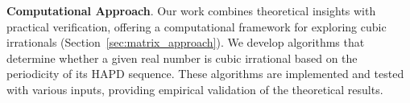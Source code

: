 \textbf{Computational Approach}. Our work combines theoretical insights with practical verification, offering a computational framework for exploring cubic irrationals (Section~\ref{sec:matrix_approach}). We develop algorithms that determine whether a given real number is cubic irrational based on the periodicity of its HAPD sequence. These algorithms are implemented and tested with various inputs, providing empirical validation of the theoretical results.
